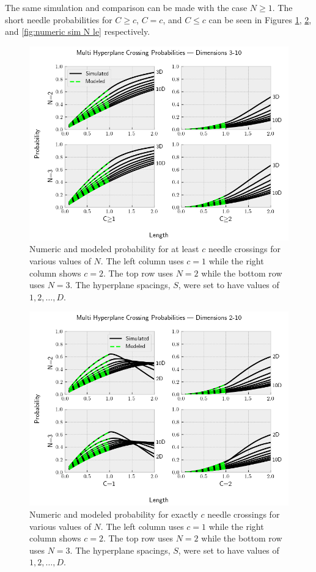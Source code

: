 \documentclass{article}
\begin{document}
The same simulation and comparison can be made with the case $N\ge 1$. The short needle probabilities
for $C\ge c$, $C=c$, and $C\le c$ can be seen in Figures \ref{fig:numeric sim N ge}, \ref{fig:numeric sim N e},
and \ref{fig:numeric sim N le} respectively.

\begin{figure}
	\centerline{\includegraphics[width=5in]{numeric_sim_N_ge.png}}
	\caption{Numeric and modeled probability for at least $c$ needle crossings for various values of $N$.
	The left column uses $c=1$ while the right column shows $c=2$. The top row uses $N=2$ while the
	bottom row uses $N=3$. The hyperplane spacings, $S$, were set to have values of $1, 2, \hdots, D$.}
	\label{fig:numeric sim N ge}
\end{figure}

\begin{figure}
	\centerline{\includegraphics[width=5in]{numeric_sim_N_e.png}}
	\caption{Numeric and modeled probability for exactly $c$ needle crossings for various values of $N$.
	The left column uses $c=1$ while the right column shows $c=2$. The top row uses $N=2$ while the
	bottom row uses $N=3$. The hyperplane spacings, $S$, were set to have values of $1, 2, \hdots, D$.}
	\label{fig:numeric sim N e}
\end{figure}
\end{document}

